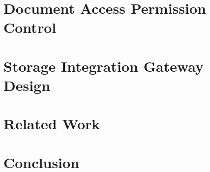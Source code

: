 \documentclass[conference]{IEEEtran}
\begin{document}
\section{Document Access Permission Control}
\label{s-accr}

\section{Storage Integration Gateway Design}
\label{s-gate}

\section{Related Work}
\label{s-rw}

\section{Conclusion}
\label{s-con}
 


\end{document}
